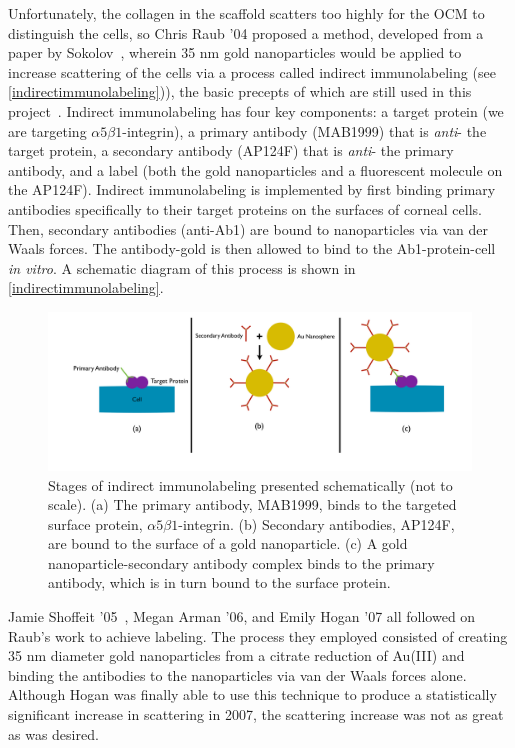 Unfortunately, the collagen in the scaffold scatters too highly for the OCM to distinguish the cells, so Chris Raub '04 proposed a method, developed from a paper by Sokolov~\citep{Sokolov}, wherein 35 nm gold nanoparticles would be applied to increase scattering of the cells via a process called indirect immunolabeling (see \autoref{indirectimmunolabeling})), the basic precepts of which are still used in this project~\citep{raub}. Indirect immunolabeling has four key components: a target protein (we are targeting $\alpha 5 \beta 1$-integrin), a primary antibody (MAB1999) that is \emph{anti}- the target protein, a secondary antibody (AP124F) that is \emph{anti}- the primary antibody, and a label (both the gold nanoparticles and a fluorescent molecule on the AP124F). Indirect immunolabeling is implemented by first binding primary antibodies specifically to their target proteins on the surfaces of corneal cells. Then, secondary antibodies (anti-Ab1) are bound to nanoparticles via van der Waals forces. The antibody-gold is then allowed to bind to the Ab1-protein-cell \emph{in vitro}. A schematic diagram of this process is shown in \autoref{indirectimmunolabeling}.

\begin{figure}[htbp]
\centering
\includegraphics[keepaspectratio,width=\textwidth,height=0.75\textheight]{./IndirectImmunolabeling.pdf}
\caption{Stages of indirect immunolabeling presented schematically (not to scale). (a) The primary antibody, MAB1999, binds to the targeted surface protein, $\alpha 5 \beta 1$-integrin. (b) Secondary antibodies, AP124F, are bound to the surface of a gold nanoparticle. (c) A gold nanoparticle-secondary antibody complex binds to the primary antibody, which is in turn bound to the surface protein.}
\label{indirectimmunolabeling}
\end{figure}



Jamie Shoffeit '05~\citep{chanshoffeit}, Megan Arman '06, and Emily Hogan '07 all followed on Raub's work to achieve labeling. The process they employed consisted of creating 35 nm diameter gold nanoparticles from a citrate reduction of Au(III) and binding the antibodies to the nanoparticles via van der Waals forces alone. Although Hogan was finally able to use this technique to produce a statistically significant increase in scattering in 2007, the scattering increase was not as great as was desired.

